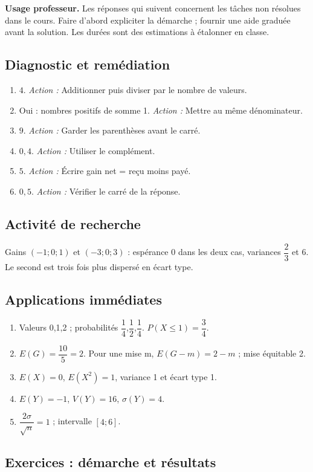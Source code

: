 \label{C08-CORR}
\textbf{Usage professeur.} Les réponses qui suivent concernent les tâches non résolues dans le cours. Faire d’abord expliciter la démarche ; fournir une aide graduée avant la solution. Les durées sont des estimations à étalonner en classe.
\subsection*{Diagnostic et remédiation}
\begin{enumerate}
\item $4$. \textit{Action :} Additionner puis diviser par le nombre de valeurs.
\item Oui : nombres positifs de somme 1. \textit{Action :} Mettre au même dénominateur.
\item $9$. \textit{Action :} Garder les parenthèses avant le carré.
\item $0{,}4$. \textit{Action :} Utiliser le complément.
\item $5$. \textit{Action :} Écrire gain net = reçu moins payé.
\item $0{,}5$. \textit{Action :} Vérifier le carré de la réponse.
\end{enumerate}
\subsection*{Activité de recherche}
Gains $(-1;0;1)$ et $(-3;0;3)$ : espérance 0 dans les deux cas, variances $\dfrac{2}{3}$ et 6. Le second est trois fois plus dispersé en écart type.
\subsection*{Applications immédiates}
\begin{enumerate}
\item Valeurs 0,1,2 ; probabilités $\dfrac{1}{4}$,$\dfrac{1}{2}$,$\dfrac{1}{4}$. $P(X\leq1)=\dfrac{3}{4}$.
\item $E(G)=\dfrac{10}{5}=2$. Pour une mise m, $E(G-m)=2-m$ ; mise équitable 2.
\item $E(X)=0$, $E(X^2)=1$, variance 1 et écart type 1.
\item $E(Y)=-1$, $V(Y)=16$, $\sigma(Y)=4$.
\item $\dfrac{2\sigma}{\sqrt n}=1$ ; intervalle $[4;6]$.
\end{enumerate}
\subsection*{Exercices : démarche et résultats}
